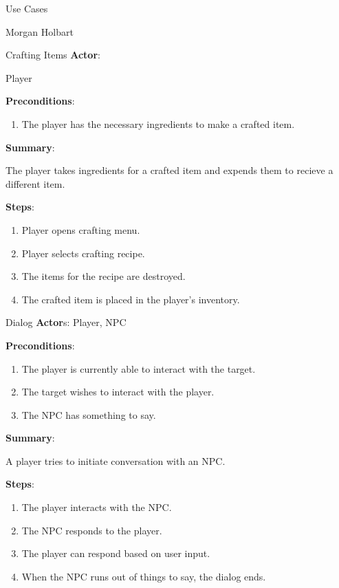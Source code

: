 \documentclass[12pt]{report}
\begin{document}
\begin{section}{Use Cases}

\begin{subsection}{Morgan Holbart}
\begin{subsubsection}{Crafting Items}
\textbf{Actor}:

Player

\textbf{Preconditions}:

\begin{enumerate}
\item The player has the necessary ingredients to make a crafted item.
\end{enumerate}

\textbf{Summary}:

The player takes ingredients for a crafted item and expends them to
recieve a different item.

\textbf{Steps}:

\begin{enumerate}
\item Player opens crafting menu.
\item Player selects crafting recipe.
\item The items for the recipe are destroyed.
\item The crafted item is placed in the player's inventory.
\end{enumerate}
\end{subsubsection}

\begin{subsubsection}{Dialog}
\textbf{Actor}s: Player, NPC

\textbf{Preconditions}:

\begin{enumerate}
\item The player is currently able to interact with the target.
\item The target wishes to interact with the player.
\item The NPC has something to say.
\end{enumerate}

\textbf{Summary}:

A player tries to initiate conversation with an NPC.

\textbf{Steps}:

\begin{enumerate}
\item The player interacts with the NPC.
\item The NPC responds to the player.
\item The player can respond based on user input.
\item When the NPC runs out of things to say, the dialog ends.
\end{enumerate}
\end{subsubsection}


\end{subsection}
\end{section}
\end{document}
